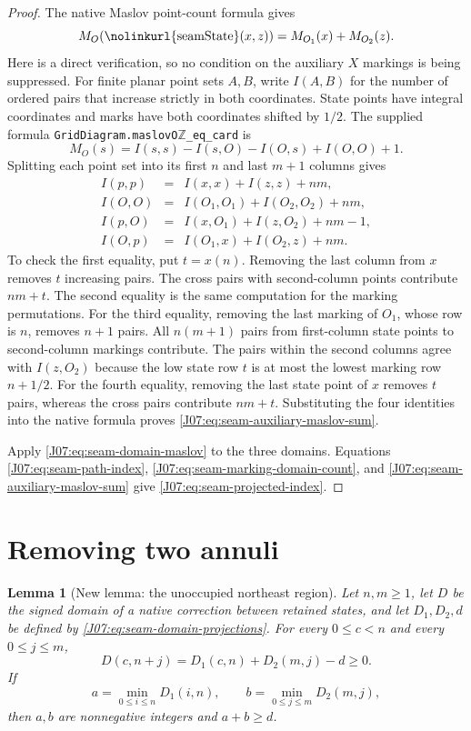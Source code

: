 \documentclass[11pt,oneside]{report}
\newtheorem{lemma}[theorem]{Lemma}
\theoremstyle{definition}
\numberwithin{equation}{section}
\newcommand{\decl}[1]{\textnormal{\nolinkurl{#1}}}
\begin{document}
\begin{proof}
The native Maslov point-count formula gives
\begin{equation}\label{J07:eq:seam-auxiliary-maslov-sum}
 M_O(\decl{seamState}(x,z))=M_{O_1}(x)+M_{O_2}(z).
\end{equation}
Here is a direct verification, so no condition on the auxiliary
$X$ markings is being suppressed. For finite planar point sets $A,B$,
write $I(A,B)$ for the number of ordered pairs that increase strictly
in both coordinates. State points have integral coordinates and marks
have both coordinates shifted by $1/2$. The supplied formula
\decl{GridDiagram.maslovO}\ensuremath{\mathbb Z}\decl{_eq_card} is
\[
 M_O(s)=I(s,s)-I(s,O)-I(O,s)+I(O,O)+1.
\]
Splitting each point set into its first $n$ and last $m+1$ columns gives
\[
\begin{array}{rcl}
 I(p,p)&=&I(x,x)+I(z,z)+nm,\\
 I(O,O)&=&I(O_1,O_1)+I(O_2,O_2)+nm,\\
 I(p,O)&=&I(x,O_1)+I(z,O_2)+nm-1,\\
 I(O,p)&=&I(O_1,x)+I(O_2,z)+nm.
\end{array}
\]
To check the first equality, put $t=x(n)$. Removing the last column
from $x$ removes $t$ increasing pairs. The cross pairs with second-column
points contribute $nm+t$. The second equality is the same computation
for the marking permutations.
For the third equality, removing the last marking of $O_1$, whose row
is $n$, removes $n+1$ pairs. All $n(m+1)$ pairs from first-column state
points to second-column markings contribute. The pairs within the second
columns agree with $I(z,O_2)$ because the low state row $t$ is at most
the lowest marking row $n+1/2$.
For the fourth equality, removing the last state point of $x$ removes
$t$ pairs, whereas the cross pairs contribute $nm+t$.
Substituting the four identities into the native formula proves
\eqref{J07:eq:seam-auxiliary-maslov-sum}.

Apply \eqref{J07:eq:seam-domain-maslov} to the three domains. Equations
\eqref{J07:eq:seam-path-index}, \eqref{J07:eq:seam-marking-domain-count}, and
\eqref{J07:eq:seam-auxiliary-maslov-sum} give
\eqref{J07:eq:seam-projected-index}.
\end{proof}


\section{Removing two annuli}

\begin{lemma}[New lemma: the unoccupied northeast region]
\label{J07:lem:j07-northeast-domain}
Let $n,m\ge1$, let $D$ be the signed domain of a native correction
between retained states, and let $D_1,D_2,d$ be defined by
\eqref{J07:eq:seam-domain-projections}.
For every $0\le c<n$ and every $0\le j\le m$,
\begin{equation}\label{J07:eq:j07-northeast-formula}
 D(c,n+j)=D_1(c,n)+D_2(m,j)-d\ge0.
\end{equation}
If
\[
 a=\min_{0\le i\le n}D_1(i,n),\qquad
 b=\min_{0\le j\le m}D_2(m,j),
\]
then $a,b$ are nonnegative integers and $a+b\ge d$.
\end{lemma}
\end{document}
